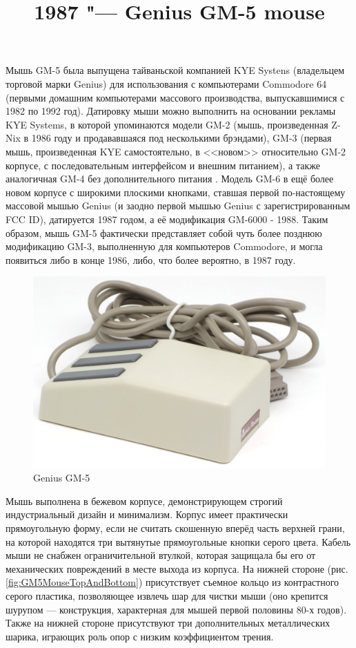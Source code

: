 \documentclass[11pt, a4paper]{article}
\begin{document}
\title{1987 "--- Genius GM-5 mouse}
\date{}
\maketitle
{}

Мышь GM-5 была выпущена тайваньской компанией KYE Systens (владельцем торговой марки  Genius) для использования с компьютерами Commodore 64 (первыми домашним компьютерами массового производства, выпускавшимися с 1982 по 1992 год). Датировку мыши можно выполнить на основании рекламы KYE Systems, в которой упоминаются модели GM-2 (мышь, произведенная Z-Nix в 1986 году и продававшаяся под несколькими брэндами), GM-3 (первая  мышь, произведенная KYE самостоятельно, в <<новом>> относительно GM-2 корпусе, с последовательным интерфейсом и внешним питанием), а также аналогичная GM-4 без дополнительного питания \cite{YourComputer}. Модель GM-6 в ещё более новом корпусе с широкими плоскими кнопками, ставшая первой по-настоящему массовой мышью Genius (и заодно первой мышью Genius с зарегистрированным FCC ID), датируется 1987 годом, а её модификация GM-6000 - 1988. Таким образом, мышь GM-5 фактически представляет собой чуть более позднюю модификацию GM-3, выполненную для компьютеров Commodore, и могла появиться либо в конце 1986, либо, что более вероятно, в 1987 году.

\begin{figure}[h]
   \centering
    \includegraphics[scale=0.77]{1987_genius_gm5_mouse/pic_30.jpg}
    \caption{Genius GM-5}
    \label{fig:GM5MousePic}
\end{figure}

Мышь выполнена в бежевом корпусе, демонстрирующем строгий индустриальный дизайн и минимализм. Корпус имеет практически прямоугольную форму, если не считать скошенную вперёд часть верхней грани, на которой находятся три вытянутые прямоугольные кнопки серого цвета. Кабель мыши не снабжен ограничительной втулкой, которая защищала бы его от механических повреждений в месте выхода из корпуса. На нижней стороне (рис. \ref{fig:GM5MouseTopAndBottom}) присутствует съемное кольцо из контрастного серого пластика, позволяющее извлечь шар для чистки мыши (оно крепится шурупом --- конструкция, характерная для мышей первой половины 80-х годов). Также на нижней стороне присутствуют три дополнительных металлических шарика, играющих роль опор с низким коэффициентом трения.
\end{document}
